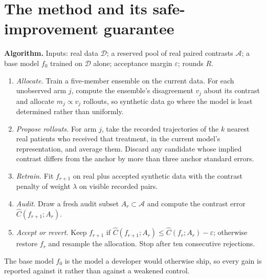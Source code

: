 \documentclass[11pt,a4paper]{article}
\begin{document}
\section{The method and its safe-improvement guarantee}
\textbf{Algorithm.} Inputs: real data $\mathcal D$; a reserved pool of real paired contrasts $\mathcal A$; a base model $f_0$ trained on $\mathcal D$ alone; acceptance margin $\varepsilon$; rounds $R$.
\begin{enumerate}\itemsep1pt
\item \emph{Allocate.} Train a five-member ensemble on the current data. For each unobserved arm $j$, compute the ensemble's disagreement $v_j$ about its contrast and allocate $m_j\propto v_j$ rollouts, so synthetic data go where the model is least determined rather than uniformly.
\item \emph{Propose rollouts.} For arm $j$, take the recorded trajectories of the $k$ nearest real patients who received that treatment, in the current model's representation, and average them. Discard any candidate whose implied contrast differs from the anchor by more than three anchor standard errors.
\item \emph{Retrain.} Fit $f_{r+1}$ on real plus accepted synthetic data with the contrast penalty of weight $\lambda$ on visible recorded pairs.
\item \emph{Audit.} Draw a fresh audit subset $A_r\subset\mathcal A$ and compute the contrast error $\hat C(f_{r+1};A_r)$.
\item \emph{Accept or revert.} Keep $f_{r+1}$ if $\hat C(f_{r+1};A_r)\le\hat C(f_r;A_r)-\varepsilon$; otherwise restore $f_r$ and resample the allocation. Stop after ten consecutive rejections.
\end{enumerate}
The base model $f_0$ is the model a developer would otherwise ship, so every gain is reported against it rather than against a weakened control.
\end{document}
